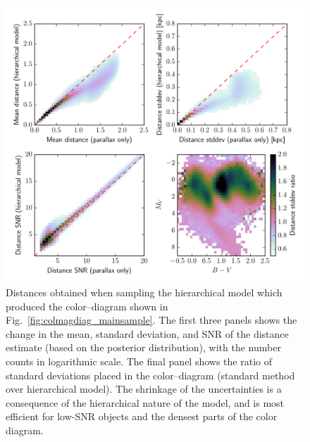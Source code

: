\documentclass[manuscript, letterpaper]{aastex6}
\newcommand{\figref}[1]{{\xspace}Fig.~\ref{#1}}
\begin{document}
\begin{figure}
\hspace*{-3mm}\includegraphics[width=15.5cm]{colmagdiag_mainsample_dist.pdf}
\caption{Distances obtained when sampling the hierarchical model which produced the color--diagram shown in \figref{fig:colmagdiag_mainsample}. 
The first three panels shows the change in the mean, standard deviation, and SNR of the distance estimate (based on the posterior distribution), with the number counts in logarithmic scale. The final panel shows the ratio of standard deviations placed in the color--diagram (standard method over hierarchical model). The shrinkage of the uncertainties is a consequence of the hierarchical nature of the model, and is most efficient for low-SNR objects and the densest parts of the color diagram.}
\label{fig:colmagdiag_mainsample_dist}
\end{figure}
\end{document}
